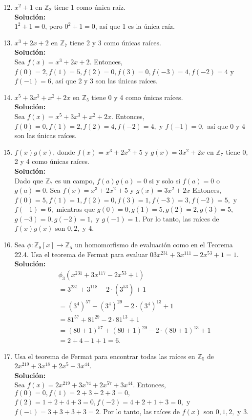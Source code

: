 \begin{enumerate}
	\setcounter{enumi}{11}
	\item $x^2 + 1$ en $\mathbb{Z}_2$ tiene 1 como única raíz.
	\\ \textbf{Solución:} \\
	$1^{2}+1=0$, pero  $0^2 + 1 = 0$, así que 1 es la única raíz.
	
	\item $x^3 + 2x + 2$ en $\mathbb{Z}_7$ tiene 2 y 3 como únicas raíces.
	\\ \textbf{Solución:} \\
	Sea  $f(x) = x^3 + 2x + 2$. Entonces,  $f(0) = 2, f(1) = 5, f(2) = 0, f(3) = 0, f(-3) = 4, f(-2) = 4$ y  $f(-1) = 6$, así que 2 y 3 son las únicas raíces.
	\item $x^5 + 3x^3 + x^2 + 2x$ en $\mathbb{Z}_5$ tiene 0 y 4 como únicas raíces.
	\\ \textbf{Solución:} \\
	Sea $f(x) = x^5 + 3x^3 + x^2 + 2x.$ Entonces, $f(0) = 0, f(1) = 2, f(2) = 4, f(-2) = 4,$  y  $f(-1) = 0,$ así que 0 y 4 son las únicas raíces.
	\item $f(x)g(x)$, donde $f(x) = x^3 + 2x^2 + 5$ y $g(x) = 3x^2 + 2x$ en $\mathbb{Z}_7$ tiene 0, 2 y 4 como únicas raíces.
	\\ \textbf{Solución:} \\
	Dado que  $\mathbb{Z}_7$ es un campo,  $f(a)g(a) = 0$ si y solo si $f(a) = 0$  o  $g(a) = 0.$ Sea  $f(x) = x^3 + 2x^2 + 5 $ y  $g(x) = 3x^2 + 2x$ Entonces,  $f(0) = 5, f(1) = 1, f(2) = 0, f(3) = 1, f(-3) = 3, f(-2) = 5,$ y  $f(-1) = 6,$  mientras que  $g(0) = 0, g(1) = 5, g(2) = 2, g(3) = 5,$ $g(-3) = 0, g(-2) = 1,$  y  $g(-1) = 1.$  Por lo tanto, las raíces de  $f(x)g(x)$ son  $0, 2,$  y  $4.$
	
	\item Sea $\phi : \mathbb{Z}_8[x] \to \mathbb{Z}_5$ un homomorfismo de evaluación como en el Teorema 22.4. Usa el teorema de Fermat para evaluar $03x^{231} + 3x^{111} - 2x^{53} + 1 = 1$.
	\\ \textbf{Solución:}
	\begin{align*}
		&\phi_3(x^{231} + 3x^{117} - 2x^{53} + 1) \\
		&= 3^{231} + 3^{118} - 2 \cdot (3^{53}) + 1 \\
		&= (3^4)^{57} + (3^4)^{29} - 2 \cdot (3^4)^{13} + 1 \\
		&= 81^{57} + 81^{29} - 2 \cdot 81^{13} + 1 \\
		&= (80 + 1)^{57} + (80 + 1)^{29} - 2 \cdot (80 + 1)^{13} + 1 \\
		&= 2 + 4 - 1 + 1 = 6.
	\end{align*}
	\item Usa el teorema de Fermat para encontrar todas las raíces en $\mathbb{Z}_5$ de $2x^{219} + 3x^{18} + 2x^5 + 3x^{44}$.
	\\ \textbf{Solución:} \\
	Sea  $f(x) = 2x^{219} + 3x^{74} + 2x^{57} + 3x^{44}.$
	Entonces, $f(0) = 0, f(1) = 2 + 3 + 2 + 3 = 0,$
	$f(2) = 1 + 2 + 4 + 3 = 0, f(-2) = 4 + 2 + 1 + 3 = 0,$ 
	y  $f(-1) = 3 + 3 + 3 + 3 = 2.$ Por lo tanto, las raíces de  $f(x)$ son  $0, 1, 2, $ y  $3$.
	

\end{enumerate}
